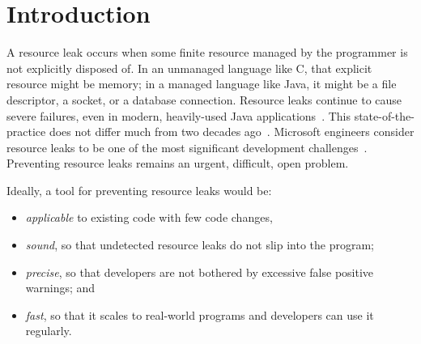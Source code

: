 \section{Introduction}
\label{sec:intro}


A resource leak occurs when some finite resource managed by the
programmer is not explicitly disposed of. In an unmanaged language
like C, that explicit resource might be memory; in a managed language
like Java, it might be a file descriptor, a socket, or a database
connection.  Resource leaks continue to cause severe failures, even in
modern, heavily-used Java applications~\cite{ghanavati2020memory}.
This state-of-the-practice does not differ much from two decades
ago~\cite{WeimerN04}.
Microsoft engineers consider resource leaks to be one of the most
significant development challenges~\cite{LoNZ2015}.
Preventing resource leaks remains an urgent, difficult, open problem.


Ideally, a tool for preventing resource leaks would be:
\vspace{-5pt}
\begin{itemize}
\item \emph{applicable} to
  existing code with few code changes,
\item \emph{sound}, so that undetected resource leaks do not slip into
  the program;
\item \emph{precise}, so that developers are not bothered by excessive false positive
  warnings; and
\item \emph{fast}, so that it scales to real-world programs and
  developers can use it regularly.
\end{itemize}
\vspace{-5pt}

